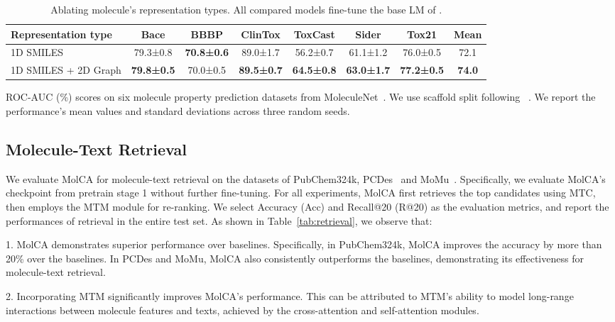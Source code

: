 \documentclass[11pt]{article}
\begin{document}
\begin{table*}[t]
\begin{subtable}[t]{\textwidth}
\end{subtable}
\begin{subtable}[t]{\textwidth}
\centering
\small
\begin{tabular}{lcccccc|c} \toprule
Representation type  & Bace              & BBBP              & ClinTox           & ToxCast           & Sider             & Tox21             & Mean          \\\midrule
1D SMILES            & 79.3±0.8          & \textbf{70.8±0.6} & 89.0±1.7          & 56.2±0.7          & 61.1±1.2          & 76.0±0.5          & 72.1          \\
1D SMILES + 2D Graph & \textbf{79.8±0.5} & 70.0±0.5          & \textbf{89.5±0.7} & \textbf{64.5±0.8} & \textbf{63.0±1.7} & \textbf{77.2±0.5} & \textbf{74.0} \\\bottomrule
\end{tabular}
\caption{ROC-AUC (\%) scores on six molecule property prediction datasets from MoleculeNet~\cite{MoleculeNet}. We use scaffold split following ~\cite{pretrain_gnn}. We report the performance's mean values and standard deviations across three random seeds.}
\end{subtable}
\caption{Ablating molecule's representation types. All compared models fine-tune the base LM of .}
\label{tab:ablation}
\end{table*}



\subsection{Molecule-Text Retrieval}
\label{sec:retrieval}
We evaluate MolCA for molecule-text retrieval on the datasets of PubChem324k, PCDes~\cite{KVPLM} and MoMu~\cite{MoMu}. Specifically, we evaluate MolCA's checkpoint from pretrain stage 1 without further fine-tuning. For all experiments, MolCA first retrieves the top  candidates using MTC, then employs the MTM module for re-ranking. 
We select Accuracy (Acc) and Recall@20 (R@20) as the evaluation metrics, and report the performances of retrieval in the entire test set. As shown in Table~\ref{tab:retrieval}, we observe that:

1. MolCA demonstrates superior performance over baselines. Specifically, in PubChem324k, MolCA improves the accuracy by more than 20\% over the baselines. 
In PCDes and MoMu, MolCA also consistently outperforms the baselines, demonstrating its effectiveness for molecule-text retrieval.

2. Incorporating MTM significantly improves MolCA's performance. This can be attributed to MTM's ability to model long-range interactions between molecule features and texts, achieved by the cross-attention and self-attention modules. 
\end{document}
